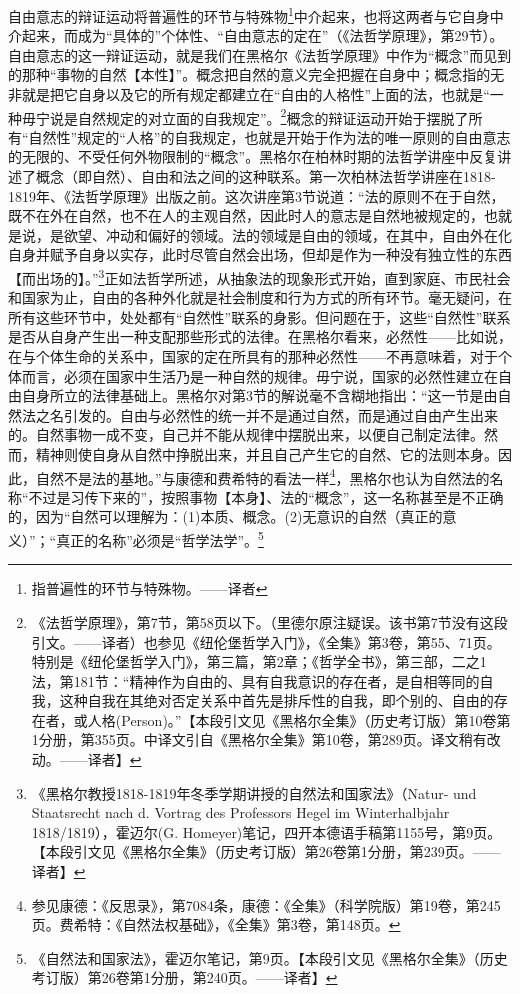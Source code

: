 自由意志的辩证运动将普遍性的环节与特殊物\footnote{指普遍性的环节与特殊物。——译者}中介起来，也将这两者与它自身中介起来，而成为“具体的”个体性、“自由意志的定在”（《法哲学原理》，第29节）。自由意志的这一辩证运动，就是我们在黑格尔《法哲学原理》中作为“概念”而见到的那种“事物的自然【本性】”。概念把自然的意义完全把握在自身中；概念指的无非就是把它自身以及它的所有规定都建立在“自由的人格性”上面的法，也就是“一种毋宁说是自然规定的对立面的自我规定”。\footnote{《法哲学原理》，第7节，第58页以下。（里德尔原注疑误。该书第7节没有这段引文。——译者）也参见《纽伦堡哲学入门》，《全集》第3卷，第55、71页。特别是《纽伦堡哲学入门》，第三篇，第2章；《哲学全书》，第三部，二之1 法，第181节：“精神作为自由的、具有自我意识的存在者，是自相等同的自我，这种自我在其绝对否定关系中首先是排斥性的自我，即个别的、自由的存在者，或人格(Person)。”【本段引文见《黑格尔全集》（历史考订版）第10卷第1分册，第355页。中译文引自《黑格尔全集》第10卷，第289页。译文稍有改动。——译者】}概念的辩证运动开始于摆脱了所有“自然性”规定的“人格”的自我规定，也就是开始于作为法的唯一原则的自由意志的无限的、不受任何外物限制的“概念”。黑格尔在柏林时期的法哲学讲座中反复讲述了概念（即自然）、自由和法之间的这种联系。第一次柏林法哲学讲座在1818-1819年、《法哲学原理》出版之前。这次讲座第3节说道：“法的原则不在于自然，既不在外在自然，也不在人的主观自然，因此时人的意志是自然地被规定的，也就是说，是欲望、冲动和偏好的领域。法的领域是自由的领域，在其中，自由外在化自身并赋予自身以实存，此时尽管自然会出场，但却是作为一种没有独立性的东西【而出场的】。”\footnote{《黑格尔教授1818-1819年冬季学期讲授的自然法和国家法》（Natur- und Staatsrecht nach d. Vortrag des Professors Hegel im Winterhalbjahr 1818/1819），霍迈尔(G. Homeyer)笔记，四开本德语手稿第1155号，第9页。【本段引文见《黑格尔全集》（历史考订版）第26卷第1分册，第239页。——译者】}正如法哲学所述，从抽象法的现象形式开始，直到家庭、市民社会和国家为止，自由的各种外化就是社会制度和行为方式的所有环节。毫无疑问，在所有这些环节中，处处都有“自然性”联系的身影。但问题在于，这些“自然性”联系是否从自身产生出一种支配那些形式的法律。在黑格尔看来，必然性——比如说，在与个体生命的关系中，国家的定在所具有的那种必然性——不再意味着，对于个体而言，必须在国家中生活乃是一种自然的规律。毋宁说，国家的必然性建立在自由自身所立的法律基础上。黑格尔对第3节的解说毫不含糊地指出：“这一节是由自然法之名引发的。自由与必然性的统一并不是通过自然，而是通过自由产生出来的。自然事物一成不变，自己并不能从规律中摆脱出来，以便自己制定法律。然而，精神则使自身从自然中挣脱出来，并且自己产生它的自然、它的法则本身。因此，自然不是法的基地。”与康德和费希特的看法一样\footnote{参见康德：《反思录》，第7084条，康德：《全集》（科学院版）第19卷，第245页。费希特：《自然法权基础》，《全集》第3卷，第148页。}，黑格尔也认为自然法的名称“不过是习传下来的”，按照事物【本身】、法的“概念”，这一名称甚至是不正确的，因为“自然可以理解为：(1)本质、概念。(2)无意识的自然（真正的意义）”；“真正的名称”必须是“哲学法学”。\footnote{《自然法和国家法》，霍迈尔笔记，第9页。【本段引文见《黑格尔全集》（历史考订版）第26卷第1分册，第240页。——译者】}

